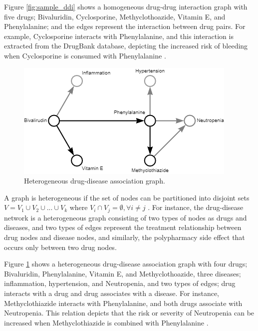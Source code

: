 Figure \ref{fig:sample_ddi} shows a homogeneous drug-drug interaction graph with five drugs; Bivaluridin, Cyclosporine, Methyclothoazide, Vitamin E, and Phenylalanine; and the edges represent the interaction between drug pairs. For example, Cyclosporine interacts with Phenylalanine, and this interaction is extracted from the DrugBank database, depicting the increased risk of bleeding when Cyclosporine is consumed with Phenylalanine \cite{ihlefeldt2014polymorphs}. 


\begin{figure}[h]
    \centering
        \includegraphics[width=0.65\linewidth]{chapters/background/figures/dda.png} 
    \caption{Heterogeneous drug-disease association graph.}
    \label{fig:sample_dda}
\end{figure}
A graph is heterogeneous if the set of nodes can be partitioned into disjoint sets $V = V_{1} \cup V_{2} \cup ... \cup V_{k} $ where $V_{i} \cap V_{j} = \emptyset , \forall i \neq j$ \cite{sun2013mining}. For instance, the drug-disease network is a heterogeneous graph consisting of two types of nodes as drugs and diseases, and two types of edges represent the treatment relationship between drug nodes and disease nodes, and similarly, the polypharmacy side effect that occurs only between two drug nodes. 

Figure \ref{fig:sample_dda} shows a heterogeneous drug-disease association graph with four drugs; Bivaluridin, Phenylalanine, Vitamin E, and Methyclothoazide, three diseases; inflammation, hypertension, and Neutropenia, and two types of edges; drug interacts with a drug and drug associates with a disease. For instance, Methyclothiazide interacts with Phenylalanine, and both drugs associate with Neutropenia. This relation depicts that the risk or severity of Neutropenia can be increased when Methyclothiazide is combined with Phenylalanine \cite{ruiz2022primary}. 





